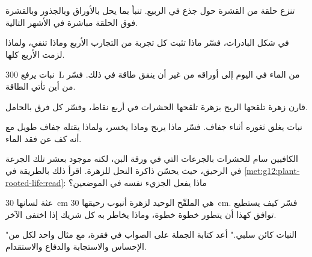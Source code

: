 \begin{exercise}[$\star\star$]\label{exo:g12:plant-rooted-life:8}
تنزع حلقة من القشرة حول جذع في الربيع. تنبأ بما يحل بالأوراق
وبالجذور وبالقشرة فوق الحلقة مباشرة في الأشهر التالية.
\end{exercise}

\begin{exercise}[$\star\star$]\label{exo:g12:plant-rooted-life:9}
في شكل البادرات، فسّر ماذا تثبت كل تجربة من التجارب الأربع وماذا تنفي،
ولماذا لزمت الأربع كلها.
\end{exercise}

\begin{exercise}[$\star\star$]\label{exo:g12:plant-rooted-life:10}
نبات يرفع \qty{300}{L} من الماء في اليوم إلى أوراقه من غير أن ينفق
طاقة في ذلك. فسّر من أين تأتي الطاقة.
\end{exercise}

\begin{exercise}[$\star\star$]\label{exo:g12:plant-rooted-life:11}
قارن زهرة تلقحها الريح بزهرة تلقحها الحشرات في أربع نقاط، وفسّر كل فرق
بالحامل.
\end{exercise}

\begin{exercise}[$\star\star\star$]\label{exo:g12:plant-rooted-life:12}
نبات يغلق ثغوره أثناء جفاف. فسّر ماذا يربح وماذا يخسر، ولماذا يقتله
جفاف طويل مع أنه كف عن فقد الماء.
\end{exercise}

\begin{exercise}[$\star\star\star$]\label{exo:g12:plant-rooted-life:13}
الكافيين سام للحشرات بالجرعات التي في ورقة البن، لكنه موجود بعشر تلك
الجرعة في الرحيق، حيث يحسّن ذاكرة النحل للزهرة. اقرأ ذلك بالطريقة في
\cref{met:g12:plant-rooted-life:read}: ماذا يفعل الجزيء نفسه في
الموضعين؟
\end{exercise}

\begin{exercise}[$\star\star\star$]\label{exo:g12:plant-rooted-life:14}
عثة لسانها \qty{30}{cm} هي الملقّح الوحيد لزهرة أنبوب رحيقها
\qty{30}{cm}. فسّر كيف يستطيع توافق كهذا أن يتطور خطوة خطوة، وماذا
يخاطر به كل شريك إذا اختفى الآخر.
\end{exercise}

\begin{exercise}[$\star\star\star$]\label{exo:g12:plant-rooted-life:15}
"النبات كائن سلبي." أعد كتابة الجملة على الصواب في فقرة، مع مثال واحد
لكل من الإحساس والاستجابة والدفاع والاستقدام.
\end{exercise}

